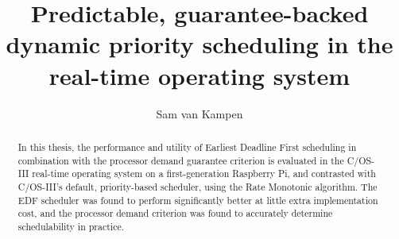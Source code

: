\documentclass[twoside]{uva-inf-bachelor-thesis}
\title{Predictable, guarantee-backed\\dynamic priority scheduling in the \ucosiii real-time operating system}
\author{Sam van Kampen}
\newcommand{\ucosiii}{\textmu C/OS-III\xspace}
\begin{document}
\maketitle

\begin{abstract}
    In this thesis, the performance and utility of Earliest Deadline First scheduling in combination with the processor demand guarantee criterion is evaluated in the \ucosiii real-time operating system on a first-generation Raspberry Pi, and contrasted with \ucosiii's default, priority-based scheduler, using the Rate Monotonic algorithm. The EDF scheduler was found to perform significantly better at little extra implementation cost, and the processor demand criterion was found to accurately determine schedulability in practice.
\end{abstract}


\tableofcontents

%
%
%
%



%
%
%
%



%
%
%
%



%
%
%
%



%
%
%
%



%
%
%
%



%
%



{
    \hfuzz=8pt
    \printbibliography
}
\end{document}
